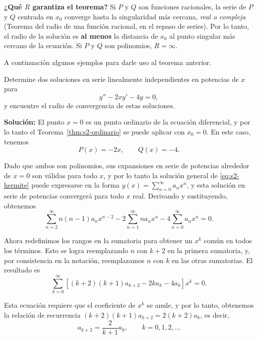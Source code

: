\begin{remark}
\textbf{¿Qué $R$ garantiza el teorema?} Si $P$ y $Q$ son funciones racionales, la serie de $P$ y $Q$ centrada en $x_0$ converge hasta la singularidad más cercana, \emph{real o compleja} (Teorema del radio de una función racional, en el repaso de series). Por lo tanto, el radio de la solución es \textbf{al menos} la distancia de $x_0$ al punto singular más cercano de la ecuación. Si $P$ y $Q$ son polinomios, $R=\infty$.
\end{remark}
 
A continuación algunos ejemplos para darle uso al teorema anterior.
 
\begin{example}\label{ex:s2-hermite}
  Determine dos soluciones en serie linealmente independientes en potencias de $x$ para
\begin{equation}
y'' - 2xy' - 4y = 0,
\label{eq:s2-hermite}
\end{equation}
y encuentre el radio de convergencia de estas soluciones.
 
\noindent \textbf{Solución:} \quad El punto $x = 0$ es un punto ordinario de la ecuación diferencial, y por lo tanto el Teorema~\ref{thm:s2-ordinario} se puede aplicar con $x_0 = 0$. En este caso, tenemos
\[ P(x) = -2x, \qquad Q(x) = -4. \]
 
Dado que ambos son polinomios, sus expansiones en serie de potencias alrededor de $x = 0$ son válidas para todo $x$, y por lo tanto la solución general de \eqref{eq:s2-hermite} puede expresarse en la forma $y(x) = \sum_{n=0}^{\infty} a_n x^n$, y esta solución en serie de potencias convergerá para todo $x$ real. Derivando y sustituyendo, obtenemos
\[ \sum_{n=2}^{\infty} n(n-1)a_n x^{n-2} - 2\sum_{n=1}^{\infty} n a_n x^n - 4\sum_{n=0}^{\infty} a_n x^n = 0. \]
 
Ahora redefinimos los rangos en la sumatoria para obtener un $x^k$ común en todos los términos. Esto se logra reemplazando $n$ con $k + 2$ en la primera sumatoria, y, por consistencia en la notación, reemplazamos $n$ con $k$ en las otras sumatorias. El resultado es
\[ \sum_{k=0}^{\infty} [(k+2)(k+1)a_{k+2} - 2ka_k - 4a_k]x^k = 0. \]
 
Esta ecuación requiere que el coeficiente de $x^k$ se anule, y por lo tanto, obtenemos la relación de recurrencia $(k+2)(k+1)a_{k+2} = 2(k+2)a_k$, es decir,
\begin{equation}
a_{k+2} = \frac{2}{k+1}a_k, \qquad k = 0, 1, 2, \dots
\label{eq:s2-rec-hermite}
\end{equation}
 

\end{example}
